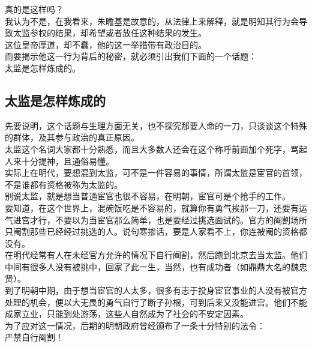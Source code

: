 \begin{multicols}{\theparacolNo}
真的是这样吗？\\

我认为不是，在我看来，朱瞻基是故意的，从法律上来解释，就是明知其行为会导致太监参权的结果，却希望或者放任这种结果的发生。\\

这位皇帝厚道，却不蠢，他的这一举措带有政治目的。\\

而要揭示他这一行为背后的秘密，就必须引出我们下面的一个话题：\\

太监是怎样炼成的。\\

\subsection{太监是怎样炼成的}
先要说明，这个话题与生理方面无关，也不探究那要人命的一刀，只谈谈这个特殊的群体，及其参与政治的真正原因。\\

太监这个名词大家都十分熟悉，而且大多数人还会在这个称呼前面加个死字，骂起人来十分提神，且通俗易懂。\\

实际上在明代，要想混到太监，可不是一件容易的事情，所谓太监是宦官的首领，不是谁都有资格被称为太监的。\\

别说太监，就是想当普通宦官也很不容易，在明朝，宦官可是个抢手的工作。\\

要知道，在这个世界上，混碗饭吃是不容易的，就算你有勇气挨那一刀，还要有运气进宫才行，不要以为当宦官那么简单，也是要经过挑选面试的。官方的阉割场所只阉割那些已经经过挑选的人。说句寒掺话，要是人家看不上，你连被阉的资格都没有。\\

在明代经常有人在未经官方允许的情况下自行阉割，然后跑到北京去当太监。他们中间有很多人没有被挑中，回家了此一生，当然，也有成功者（如鼎鼎大名的魏忠贤）。\\

到了明朝中期，由于想当宦官的人太多，很多有志于投身宦官事业的人没有被官方处理的机会，便以大无畏的勇气自行了断子孙根，可到后来又没能进宫。他们不能成家立业，只能到处游荡，这些人自然成为了社会的不安定因素。\\

为了应对这一情况，后期的明朝政府曾经颁布了一条十分特别的法令：\\

严禁自行阉割！\\


\end{multicols}
